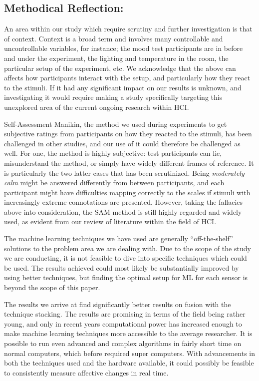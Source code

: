 \subsection{Methodical Reflection:}
An area within our study which require scrutiny and further investigation is
that of context. Context is a broad term and involves many controllable and
uncontrollable variables, for instance; the mood test participants are in
before and under the experiment, the lighting and temperature in the room, the
particular setup of the experiment, etc. We acknowledge that the above can
affects how participants interact with the setup, and particularly how they
react to the stimuli. If it had any significant impact on our results is
unknown, and investigating it would require making a study specifically targeting this unexplored area of the current ongoing research within HCI.

Self-Assessment Manikin, the method we used during experiments to get subjective
ratings from participants on how they reacted to the stimuli, has been
challenged in other studies, and our use of it could therefore be challenged as
well. For one, the method is highly subjective: test participants can lie,
misunderstand the method, or simply have widely different frames of
reference. It is particularly the two latter cases that has been
scrutinized. Being \textit{moderately calm} might be answered differently from
between participants, and each participant might have difficulties mapping
correctly to the scales if stimuli with increasingly extreme connotations are
presented. However, taking the fallacies above into consideration, the SAM
method is still highly regarded and widely used, as evident from our review of
literature within the field of HCI.\cite{fusion4}

The machine learning techniques we have used are generally ``off-the-shelf'' solutions to the problem area we are dealing with.
Due to the scope of the study we are conducting, it is not feasible to dive into specific techniques which could be used.
The results achieved could most likely be substantially improved by using better techniques, but finding the optimal setup for ML for each sensor is beyond the scope of this paper.

The results we arrive at find significantly better results on fusion with the technique stacking.
The results are promising in terms of the field being rather young, and only in recent years computational power has increased enough to make machine learning techniques more accessible to the average researcher. It is possible to run even advanced and complex algorithms in fairly short time on normal computers, which before required super computers. 
With advancements in both the techniques used and the hardware available, it could possibly be feasible to consistently measure affective changes in real time. 


